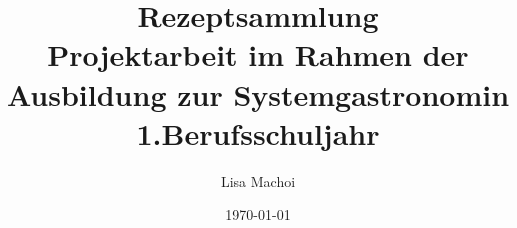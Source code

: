 \documentclass[10pt,a4paper]{article}
\begin{document}
\thispagestyle{empty}
\title{Rezeptsammlung\\
	\vspace{1cm}
	{\large Projektarbeit im Rahmen der Ausbildung zur Systemgastronomin}\\
	{\small 1.Berufsschuljahr}
	\vspace{2cm}
}
\author{Lisa Machoi}
\date{\today}
\maketitle
\newpage
\thispagestyle{empty}
\tableofcontents
\setcounter{page}{0}
%
\newpage
\setcounter{page}{1}


















\end{document}

